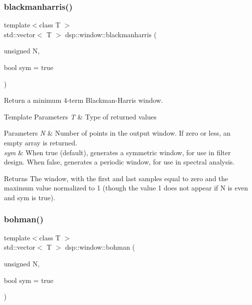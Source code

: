 \subsubsection{\texorpdfstring{blackmanharris()}{blackmanharris()}}
{\footnotesize\ttfamily template$<$class T $>$ \\
std\+::vector$<$ T $>$ dsp\+::window\+::blackmanharris (\begin{DoxyParamCaption}\item[{unsigned}]{N,  }\item[{bool}]{sym = {\ttfamily true} }\end{DoxyParamCaption})}



Return a minimum 4-\/term Blackman-\/\+Harris window. 


\begin{DoxyTemplParams}{Template Parameters}
{\em T} & Type of returned values \\
\hline
\end{DoxyTemplParams}

\begin{DoxyParams}{Parameters}
{\em N} & Number of points in the output window. If zero or less, an empty array is returned. \\
\hline
{\em sym} & When true (default), generates a symmetric window, for use in filter design. When false, generates a periodic window, for use in spectral analysis. \\
\hline
\end{DoxyParams}
\begin{DoxyReturn}{Returns}
The window, with the first and last samples equal to zero and the maximum value normalized to 1 (though the value 1 does not appear if N is even and sym is true). 
\end{DoxyReturn}
\mbox{\label{namespacedsp_1_1window_a72327b8f54fe769b2345389ddab7f575}} 
\subsubsection{\texorpdfstring{bohman()}{bohman()}}
{\footnotesize\ttfamily template$<$class T $>$ \\
std\+::vector$<$ T $>$ dsp\+::window\+::bohman (\begin{DoxyParamCaption}\item[{unsigned}]{N,  }\item[{bool}]{sym = {\ttfamily true} }\end{DoxyParamCaption})}



